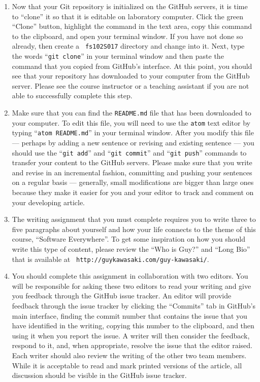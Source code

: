 \begin{enumerate}
  \item Now that your Git repository is initialized on the GitHub servers, it is time to ``clone'' it so that it is
    editable on laboratory computer. Click the green ``Clone'' button, highlight the command in the text area, copy this
    command to the clipboard, and open your terminal window. If you have not done so already, then create a {\tt
    fs102S017} directory and change into it. Next, type the words ``{\tt git clone}'' in your terminal window and then
    paste the command that you copied from GitHub's interface. At this point, you should see that your repository has
    downloaded to your computer from the GitHub server. Please see the course instructor or a teaching assistant if you
    are not able to successfully complete this step.

  \item Make sure that you can find the {\tt README.md} file that has been downloaded to your computer. To edit this
    file, you will need to use the {\tt atom} text editor by typing ``{\tt atom README.md}'' in your terminal window.
    After you modify this file --- perhaps by adding a new sentence or revising and existing sentence --- you should use
    the ``{\tt git add}'' and ``{\tt git commit}'' and ``{\tt git push}'' commands to transfer your content to the
    GitHub servers. Please make sure that you write and revise in an incremental fashion, committing and pushing your
    sentences on a regular basis --- generally, small modifications are bigger than large ones because they make it
    easier for you and your editor to track and comment on your developing article.

  \item The writing assignment that you must complete requires you to write three to five paragraphs about yourself and
    how your life connects to the theme of this course, ``Software Everywhere''. To get some inspiration on how you
    should write this type of content, please review the ``Who is Guy?'' and ``Long Bio'' that is available at {\tt
    http://guykawasaki.com/guy-kawasaki/}.

  \item You should complete this assignment in collaboration with two editors. You will be responsible for asking these
    two editors to read your writing and give you feedback through the GitHub issue tracker. An editor will provide
    feedback through the issue tracker by clicking the ``Commits'' tab in GitHub's main interface, finding the commit
    number that contains the issue that you have identified in the writing, copying this number to the clipboard, and
    then using it when you report the issue. A writer will then consider the feedback, respond to it, and, when
    appropriate, resolve the issue that the editor raised. Each writer should also review the writing of the other two
    team members. While it is acceptable to read and mark printed versions of the article, all discussion should be
    visible in the GitHub issue tracker.


\end{enumerate}
